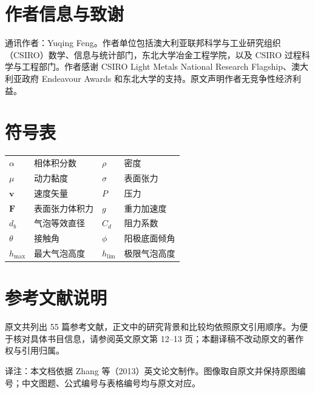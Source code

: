\documentclass[UTF8,11pt,a4paper,fontset=fandol]{ctexart}
\begin{document}
\section*{作者信息与致谢}
通讯作者：Yuqing Feng。作者单位包括澳大利亚联邦科学与工业研究组织（CSIRO）数学、信息与统计部门，东北大学冶金工程学院，以及 CSIRO 过程科学与工程部门。作者感谢 CSIRO Light Metals National Research Flagship、澳大利亚政府 Endeavour Awards 和东北大学的支持。原文声明作者无竞争性经济利益。

\section*{符号表}
\begin{tabular}{ll@{\qquad}ll}
$\alpha$ & 相体积分数 & $\rho$ & 密度\\
$\mu$ & 动力黏度 & $\sigma$ & 表面张力\\
$\bm v$ & 速度矢量 & $P$ & 压力\\
$\bm F$ & 表面张力体积力 & $g$ & 重力加速度\\
$d_b$ & 气泡等效直径 & $C_d$ & 阻力系数\\
$\theta$ & 接触角 & $\phi$ & 阳极底面倾角\\
$h_{\max}$ & 最大气泡高度 & $h_{\lim}$ & 极限气泡高度\\
\end{tabular}

\section*{参考文献说明}
原文共列出 55 篇参考文献，正文中的研究背景和比较均依照原文引用顺序。为便于核对具体书目信息，请参阅英文原文第 12--13 页；本翻译稿不改动原文的著作权与引用归属。

\vfill
\begin{center}\small\color{gray}
译注：本文档依据 Zhang 等（2013）英文论文制作。图像取自原文并保持原图编号；中文图题、公式编号与表格编号均与原文对应。
\end{center}
\end{document}
